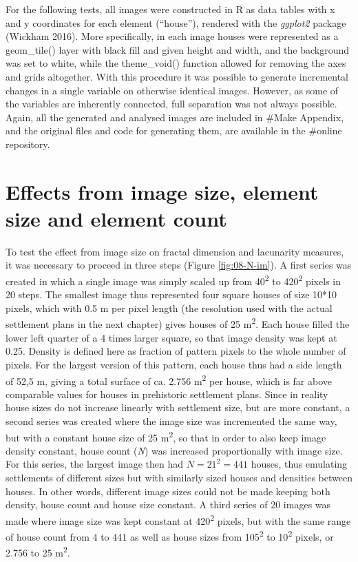 \documentclass[
  12pt,
  a4paper, twoside]{book}
\begin{document}
For the following tests, all images were constructed in R as data tables with x and y coordinates for each element (``house''), rendered with the \emph{ggplot2} package (Wickham 2016). More specifically, in each image houses were represented as a geom\_tile() layer with black fill and given height and width, and the background was set to white, while the theme\_void() function allowed for removing the axes and grids altogether. With this procedure it was possible to generate incremental changes in a single variable on otherwise identical images. However, as some of the variables are inherently connected, full separation was not always possible. Again, all the generated and analysed images are included in \#Make Appendix, and the original files and code for generating them, are available in the \#online repository.

\hypertarget{effects-from-image-size-element-size-and-element-count}{%
\section{Effects from image size, element size and element count}\label{effects-from-image-size-element-size-and-element-count}}

To test the effect from image size on fractal dimension and lacunarity measures, it was necessary to proceed in three steps (Figure \ref{fig:08-N-im}). A first series was created in which a single image was simply scaled up from 40\textsuperscript{2} to 420\textsuperscript{2} pixels in 20 steps. The smallest image thus represented four square houses of size 10*10 pixels, which with 0.5 m per pixel length (the resolution used with the actual settlement plans in the next chapter) gives houses of 25 m\textsuperscript{2}. Each house filled the lower left quarter of a 4 times larger square, so that image density was kept at 0.25. Density is defined here as fraction of pattern pixels to the whole number of pixels. For the largest version of this pattern, each house thus had a side length of 52,5 m, giving a total surface of ca. 2.756 m\textsuperscript{2} per house, which is far above comparable values for houses in prehistoric settlement plans. Since in reality house sizes do not increase linearly with settlement size, but are more constant, a second series was created where the image size was incremented the same way, but with a constant house size of 25 m\textsuperscript{2}, so that in order to also keep image density constant, house count (\emph{N}) was increased proportionally with image size. For this series, the largest image then had \(N = 21^2 = 441\) houses, thus emulating settlements of different sizes but with similarly sized houses and densities between houses. In other words, different image sizes could not be made keeping both density, house count and house size constant. A third series of 20 images was made where image size was kept constant at 420\textsuperscript{2} pixels, but with the same range of house count from 4 to 441 as well as house sizes from 105\textsuperscript{2} to 10\textsuperscript{2} pixels, or 2.756 to 25 m\textsuperscript{2}.
\end{document}

